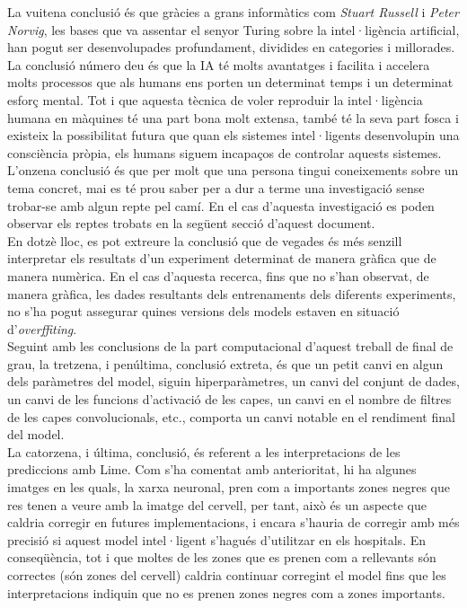 \documentclass[a4paper,12pt]{report}
\begin{document}
La vuitena conclusió és que gràcies a grans informàtics com \textit{Stuart Russell} i \textit{Peter Norvig}, les bases que va assentar el senyor Turing sobre la intel·ligència artificial, han pogut ser desenvolupades profundament, dividides en categories i millorades.\\
La conclusió número deu és que la IA té molts avantatges i facilita i accelera molts processos que als humans ens porten un determinat temps i un determinat esforç mental. Tot i que aquesta tècnica de voler reproduir la intel·ligència humana en màquines té una part bona molt extensa, també té la seva part fosca i existeix la possibilitat futura que quan els sistemes intel·ligents desenvolupin una consciència pròpia, els humans siguem incapaços de controlar aquests sistemes.\\
L'onzena conclusió és que per molt que una persona tingui coneixements sobre un tema concret, mai es té prou saber per a dur a terme una investigació sense trobar-se amb algun repte pel camí. En el cas d'aquesta investigació es poden observar els reptes trobats en la següent secció d'aquest document.\\
En dotzè lloc, es pot extreure la conclusió que de vegades és més senzill interpretar els resultats d'un experiment determinat de manera gràfica que de manera numèrica. En el cas d'aquesta recerca, fins que no s'han observat, de manera gràfica, les dades resultants dels entrenaments dels diferents experiments, no s'ha pogut assegurar quines versions dels models estaven en situació d'\textit{overffiting}.\\
Seguint amb les conclusions de la part computacional d'aquest treball de final de grau, la tretzena, i penúltima, conclusió extreta, és que un petit canvi en algun dels paràmetres del model, siguin hiperparàmetres, un canvi del conjunt de dades, un canvi de les funcions d'activació de les capes, un canvi en el nombre de filtres de les capes convolucionals, etc., comporta un canvi notable en el rendiment final del model.\\
La catorzena, i última, conclusió, és referent a les interpretacions de les prediccions amb Lime. Com s'ha comentat amb anterioritat, hi ha algunes imatges en les quals, la xarxa neuronal, pren com a importants zones negres que res tenen a veure amb la imatge del cervell, per tant, això és un aspecte que caldria corregir en futures implementacions, i encara s'hauria de corregir amb més precisió si aquest model intel·ligent s'hagués d'utilitzar en els hospitals. En conseqüència, tot i que moltes de les zones que es prenen com a rellevants són correctes (són zones del cervell) caldria continuar corregint el model fins que les interpretacions indiquin que no es prenen zones negres com a zones importants.
\end{document}
